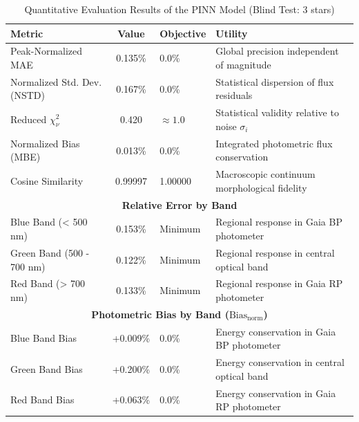 
\begin{table}[htpb]
\centering
\caption{Quantitative Evaluation Results of the PINN Model (Blind Test: 3 stars)}
\label{tab:pinn_evaluation}
\begin{tabular}{lcll}
\hline
\textbf{Metric} & \textbf{Value} & \textbf{Objective} & \textbf{Utility} \\
\hline
Peak-Normalized MAE & 0.135\% & 0.0\% & Global precision independent of magnitude \\
Normalized Std. Dev. (NSTD) & 0.167\% & 0.0\% & Statistical dispersion of flux residuals \\
Reduced $\chi^2_\nu$ & 0.420 & $\approx 1.0$ & Statistical validity relative to noise $\sigma_i$ \\
Normalized Bias (MBE) & 0.013\% & 0.0\% & Integrated photometric flux conservation \\
Cosine Similarity & 0.99997 & 1.00000 & Macroscopic continuum morphological fidelity \\
\hline
\multicolumn{4}{c}{\textbf{Relative Error by Band}} \\
\hline
Blue Band (< 500 nm) & 0.153\% & Minimum & Regional response in Gaia BP photometer \\
Green Band (500 - 700 nm) & 0.122\% & Minimum & Regional response in central optical band \\
Red Band (> 700 nm) & 0.133\% & Minimum & Regional response in Gaia RP photometer \\
\hline
\multicolumn{4}{c}{\textbf{Photometric Bias by Band ($\text{Bias}_{\text{norm}}$)}} \\
\hline
Blue Band Bias & +0.009\% & 0.0\% & Energy conservation in Gaia BP photometer \\
Green Band Bias & +0.200\% & 0.0\% & Energy conservation in central optical band \\
Red Band Bias & +0.063\% & 0.0\% & Energy conservation in Gaia RP photometer \\
\hline
\end{tabular}
\end{table}
